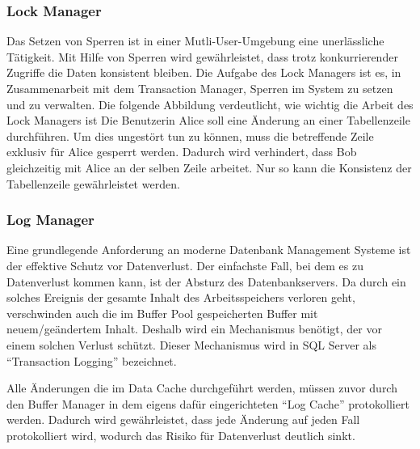         \subsubsection{Lock Manager}
          Das Setzen von Sperren ist in einer Mutli-User-Umgebung eine
          unerlässliche Tätigkeit. Mit Hilfe von Sperren wird
          gewährleistet, dass trotz konkurrierender Zugriffe die Daten
          konsistent bleiben. Die Aufgabe des Lock Managers ist es, in
          Zusammenarbeit mit dem Transaction Manager, Sperren im System zu
          setzen und zu verwalten. Die folgende Abbildung verdeutlicht, wie
          wichtig die Arbeit des Lock Managers ist
          Die Benutzerin Alice soll eine Änderung an einer Tabellenzeile
          durchführen. Um dies ungestört tun zu können, muss die betreffende
          Zeile exklusiv für Alice gesperrt werden. Dadurch wird verhindert,
          dass Bob gleichzeitig mit Alice an der selben Zeile arbeitet. Nur so
          kann die Konsistenz der Tabellenzeile gewährleistet werden.
        \subsubsection{Log Manager}
          Eine grundlegende Anforderung an moderne Datenbank Management Systeme
          ist der effektive Schutz vor Datenverlust. Der einfachste Fall, bei
          dem es zu Datenverlust kommen kann, ist der Absturz des
          Datenbankservers. Da durch ein solches Ereignis der gesamte Inhalt des
          Arbeitsspeichers verloren geht, verschwinden auch die im Buffer Pool
          gespeicherten Buffer mit neuem/geändertem Inhalt. Deshalb wird
          ein Mechanismus benötigt, der vor einem solchen Verlust schützt.
          Dieser Mechanismus wird in SQL Server als \enquote{Transaction
          Logging} bezeichnet.
        
          Alle Änderungen die im Data Cache durchgeführt werden, müssen
          zuvor durch den Buffer Manager in dem eigens dafür eingerichteten
          \enquote{Log Cache} protokolliert werden. Dadurch wird gewährleistet,
          dass jede Änderung auf jeden Fall protokolliert wird, wodurch das
          Risiko für Datenverlust deutlich sinkt.
          
